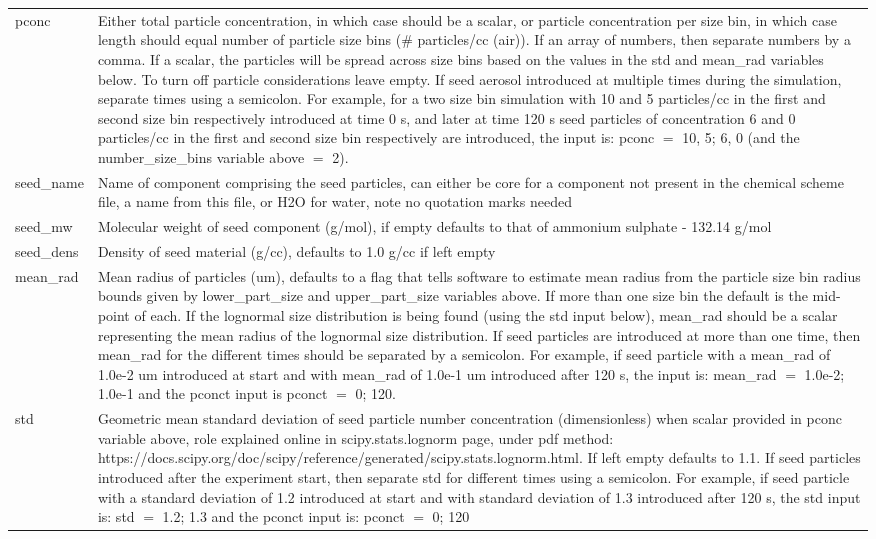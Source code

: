 \documentclass[gmd, manuscript]{copernicus}
\begin{document}
\begin{center}
\begin{supertabular}{p{0.15\textwidth}p{0.75\textwidth}}
pconc & Either total particle concentration, in which case should be a scalar, or particle concentration per size bin, in which case length should equal number of particle size bins (\# particles/cc (air)).  If an array of numbers, then separate numbers by a comma.  If a scalar, the particles will be spread across size bins based on the values in the std and mean\_rad variables below.  To turn off particle considerations leave empty.  If seed aerosol introduced at multiple times during the simulation, separate times using a semicolon.  For example, for a two size bin simulation with 10 and 5 particles/cc in the first and second size bin respectively introduced at time 0 s, and later at time 120 s seed particles of concentration 6 and 0 particles/cc in the first and second size bin respectively are introduced, the input is: pconc $=$ 10, 5; 6, 0 (and the number\_size\_bins variable above $=$ 2).\\

seed\_name & Name of component comprising the seed particles, can either be core for a component not present in the chemical scheme file, a name from this file, or H2O for water, note no quotation marks needed\\	

seed\_mw & Molecular weight of seed component (g/mol), if empty defaults to that of ammonium sulphate - 132.14 g/mol\\

seed\_dens & Density of seed material (g/cc), defaults to 1.0 g/cc if left empty \\	

mean\_rad & Mean radius of particles (um), defaults to a flag that tells software to estimate mean radius from the particle size bin radius bounds given by lower\_part\_size and upper\_part\_size variables above.  If more than one size bin the default is the mid-point of each.  If the lognormal size distribution is being found (using the std input below), mean\_rad should be a scalar representing the mean radius of the lognormal size distribution.  If seed particles are introduced at more than one time, then mean\_rad for the different times should be separated by a semicolon.  For example, if seed particle with a mean\_rad of 1.0e-2 um introduced at start and with mean\_rad of 1.0e-1 um introduced after 120 s, the input is: mean\_rad $=$ 1.0e-2; 1.0e-1 and the pconct input is pconct $=$ 0; 120.\\

std & Geometric mean standard deviation of seed particle number concentration (dimensionless) when scalar provided in pconc variable above, role explained online in scipy.stats.lognorm page, under pdf method: https://docs.scipy.org/doc/scipy/reference/generated/scipy.stats.lognorm.html.  If left empty defaults to 1.1.  If seed particles introduced after the experiment start, then separate std for different times using a semicolon.  For example, if seed particle with a standard deviation of 1.2 introduced at start and with standard deviation of 1.3 introduced after 120 s, the std input is: std $=$ 1.2; 1.3 and the pconct input is: pconct $=$ 0; 120\\


\end{supertabular}
\end{center}
\end{document}
